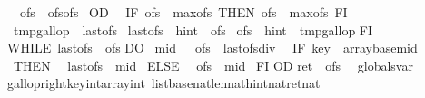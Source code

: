 \begin{isabellebody}
\ \ {\isasymacute}ofs\ {\isacharcolon}{\isacharequal}{\isacharequal}\ {\isasymacute}ofs{\isacharplus}{\isasymacute}ofs{\isacharplus}{}\isanewline
\ OD\ {\isacharsemicolon}{\isacharsemicolon}\isanewline
\ IF\ {\isasymacute}ofs\ {\isachargreater}\ {\isasymacute}max{\isacharunderscore}ofs\ THEN\ {\isasymacute}ofs\ {\isacharcolon}{\isacharequal}{\isacharequal}\ {\isasymacute}max{\isacharunderscore}ofs\ FI\ {\isacharsemicolon}{\isacharsemicolon}\isanewline
\ {\isasymacute}tmp{\isacharunderscore}gallop\ {\isacharcolon}{\isacharequal}{\isacharequal}\ {\isasymacute}last{\isacharunderscore}ofs{\isacharsemicolon}{\isacharsemicolon}\isanewline
\ {\isasymacute}last{\isacharunderscore}ofs\ {\isacharcolon}{\isacharequal}{\isacharequal}\ {\isasymacute}hint{\isacharplus}{}\ {\isacharminus}\ {\isasymacute}ofs{\isacharsemicolon}{\isacharsemicolon}\isanewline
\ {\isasymacute}ofs\ {\isacharcolon}{\isacharequal}{\isacharequal}\ {\isasymacute}hint\ {\isacharminus}\ {\isasymacute}tmp{\isacharunderscore}gallop\isanewline
FI\ {\isacharsemicolon}{\isacharsemicolon}\isanewline
WHILE\ {\isacharparenleft}{\isasymacute}last{\isacharunderscore}ofs\ {\isacharless}\ {\isasymacute}ofs{\isacharparenright}\isanewline
DO\isanewline
\ {\isasymacute}mid\ {\isacharcolon}{\isacharequal}{\isacharequal}\ \ {\isacharparenleft}{\isasymacute}ofs\ {\isacharplus}\ {\isasymacute}last{\isacharunderscore}ofs{\isacharparenright}div\ {}{\isacharsemicolon}{\isacharsemicolon}\isanewline
\ IF\ {\isacharparenleft}{\isasymacute}key\ {\isachargreater}\ {\isasymacute}array{\isacharbang}{\isacharparenleft}{\isasymacute}base{\isacharplus}{\isasymacute}mid{\isacharparenright}{\isacharparenright}\isanewline
\ THEN\isanewline
\ \ {\isasymacute}last{\isacharunderscore}ofs\ {\isacharcolon}{\isacharequal}{\isacharequal}\ {\isasymacute}mid{\isacharplus}{}\isanewline
\ ELSE\isanewline
\ \ {\isasymacute}ofs\ {\isacharcolon}{\isacharequal}{\isacharequal}\ {\isasymacute}mid\isanewline
\ FI\isanewline
OD{\isacharsemicolon}{\isacharsemicolon}\isanewline
{\isasymacute}ret\ {\isacharcolon}{\isacharequal}{\isacharequal}\ {\isasymacute}ofs\isanewline
{\isachardoublequoteclose}\isanewline
\isanewline
{}\isamarkupfalse%
\ {\isacharparenleft}\ globals{\isacharunderscore}var{\isacharparenright}\isanewline
gallop{\isacharunderscore}right{\isacharparenleft}key{\isacharcolon}{\isacharcolon}int{\isacharcomma}array{\isacharcolon}{\isacharcolon}{\isachardoublequoteopen}int\ list{\isachardoublequoteclose}{\isacharcomma}base{\isacharcolon}{\isacharcolon}nat{\isacharcomma}len{\isacharcolon}{\isacharcolon}nat{\isacharcomma}hint{\isacharcolon}{\isacharcolon}nat{\isacharbar}ret{\isacharcolon}{\isacharcolon}nat{\isacharparenright}\isanewline

\end{isabellebody}
